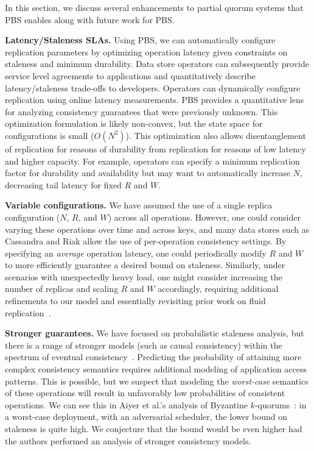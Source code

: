 \documentclass{vldb}
\begin{document}
In this section, we discuss several enhancements to partial
quorum systems that PBS enables along with future work for PBS.

\textbf{Latency/Staleness SLAs.} Using PBS, we can automatically
configure replication parameters by optimizing operation latency given
constraints on staleness and minimum durability.  Data store operators
can subsequently provide service level agreements to applications and
quantitatively describe latency/staleness trade-offs to developers.
Operators can dynamically configure replication using online latency
measurements.  PBS provides a quantitative lens for analyzing
consistency guarantees that were previously unknown.  This
optimization formulation is likely non-convex, but the state space for
configurations is small ($O(N^2)$).  This optimization also allows
disentanglement of replication for reasons of durability from
replication for reasons of low latency and higher capacity.  For
example, operators can specify a minimum replication factor for
durability and availability but may want to automatically increase
$N$, decreasing tail latency for fixed $R$ and $W$.

\textbf{Variable configurations.} We have assumed the use of a single
replica configuration ($N$, $R$, and $W$) across all operations.
However, one could consider varying these operations over time and
across keys, and many data stores such as Cassandra and Riak allow the use of
per-operation consistency settings.  By specifying an \textit{average}
operation latency, one could periodically modify $R$ and $W$ to more
efficiently guarantee a desired bound on staleness.  Similarly, under
scenarios with unexpectedly heavy load, one might consider increasing
the number of replicas and scaling $R$ and $W$ accordingly, requiring
additional refinements to our model and essentially revisiting prior work
on fluid replication~\cite{fluidreplication}.

\textbf{Stronger guarantees.} We have focused on probabilistic
staleness analysis, but there is a range of stronger models (such as
causal consistency) within the spectrum of eventual
consistency~\cite{vogels-defs}.  Predicting the probability of
attaining more complex consistency semantics requires additional
modeling of application access patterns.  This is possible, but we
suspect that modeling the \textit{worst-case} semantics of these
operations will result in unfavorably low probabilities of consistent
operations.  We can see this in Aiyer et al.'s analysis of Byzantine
$k$-quorums~\cite{multi-k-quorum}: in a worst-case deployment, with an
adversarial scheduler, the lower bound on staleness is quite high.  We
conjecture that the bound would be even higher had the authors
performed an analysis of stronger consistency models.
\end{document}
